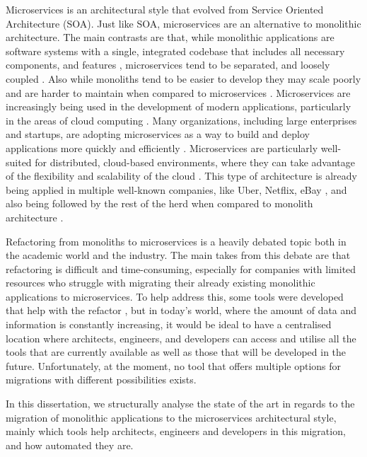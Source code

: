 Microservices is an architectural style that evolved from Service Oriented
Architecture (SOA). Just like SOA, microservices are an alternative to
monolithic architecture. The main contrasts are that, while monolithic
applications are software systems with a single, integrated codebase that
includes all necessary components, and features
\cite{kazanavivcius2019migrating}, microservices tend to be separated, and
loosely coupled \cite{newman2021building}. Also while monoliths tend to be
easier to develop they may scale poorly and are harder to maintain when
compared to microservices \cite{newman2019monolith}. Microservices are
increasingly being used in the development of modern applications, particularly
in the areas of cloud computing \cite{balalaie2016migrating}. Many
organizations, including large enterprises and startups, are adopting
microservices as a way to build and deploy applications more quickly and
efficiently \cite{richardson-microservices}. Microservices are particularly
well-suited for distributed, cloud-based environments, where they can take
advantage of the flexibility and scalability of the cloud
\cite{fowler-microservices-prerequisites}. This type of architecture is already
being applied in multiple well-known companies, like Uber, Netflix, eBay
\cite{microservices-users,ren2018migrating}, and also being followed by the
rest of the herd when compared to monolith architecture
\cite{taibi2017processes}.

Refactoring from monoliths to microservices is a heavily debated topic both in
the academic world and the industry. The main takes from this debate are that
refactoring is difficult and time-consuming, especially for companies with
limited resources who struggle with migrating their already existing monolithic
applications to microservices. To help address this, some tools were developed
that help with the refactor , but in today's world, where the
amount of data and information is constantly increasing, it would be ideal to
have a centralised location where architects, engineers, and developers can
access and utilise all the tools that are currently available as well as those
that will be developed in the future. Unfortunately, at the moment, no tool
that offers multiple options for migrations with different possibilities
exists.

In this dissertation, we structurally analyse the state of the art in regards
to the migration of monolithic applications to the microservices architectural
style, mainly which tools help architects, engineers and developers in this
migration, and how automated they are.

